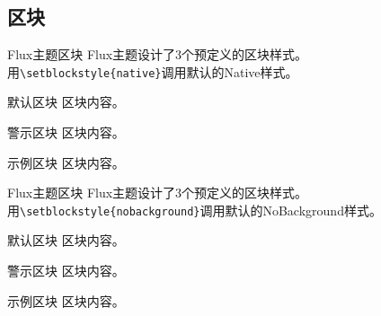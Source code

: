 \documentclass[t, aspectratio=169]{ctexbeamer}
\begin{document}
\subsection{区块}

\begin{frame}[fragile]{Flux主题}{区块}
  Flux主题设计了3个预定义的区块样式。\\
  用\verb+\setblockstyle{native}+调用默认的Native样式。\\[0.5cm]
  
  \begin{center}
    \begin{minipage}[b]{0.5\textwidth}
      \begin{block}{默认区块}
        区块内容。
      \end{block}

      \begin{alertblock}{警示区块}
        区块内容。
      \end{alertblock}

      \begin{exampleblock}{示例区块}
        区块内容。
      \end{exampleblock}
    \end{minipage}
  \end{center}
\end{frame}

\begin{frame}[fragile]{Flux主题}{区块}
  Flux主题设计了3个预定义的区块样式。\\
  用\verb+\setblockstyle{nobackground}+调用默认的NoBackground样式。\\[0.5cm]
  
  \begin{center}
  \begin{minipage}[b]{0.5\textwidth}
    \begin{block}{默认区块}
      区块内容。
    \end{block}

    \begin{alertblock}{警示区块}
      区块内容。
    \end{alertblock}

    \begin{exampleblock}{示例区块}
      区块内容。
    \end{exampleblock}
  \end{minipage}
  \end{center}
\end{frame}
\end{document}
